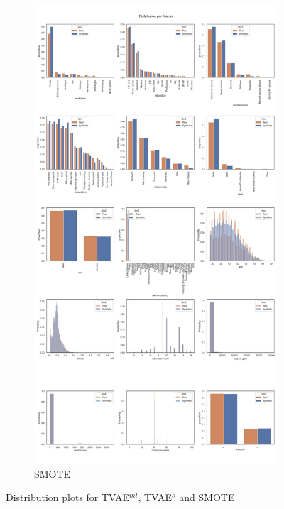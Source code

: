 \begin{landscape}
\begin{figure}[h]
\begin{subfigure}{0.3\linewidth}
			\includegraphics[height=\textheight,width=\linewidth,keepaspectratio]{images/distributions_full/smote.jpg}
			\caption{SMOTE}
		\end{subfigure}
		\caption[Distribution plots Baseline Models]{Distribution plots for TVAE$^{ml}$, TVAE$^s$ and SMOTE}
		\label{fig_a:dist_2}
	\end{figure}
\end{landscape}
